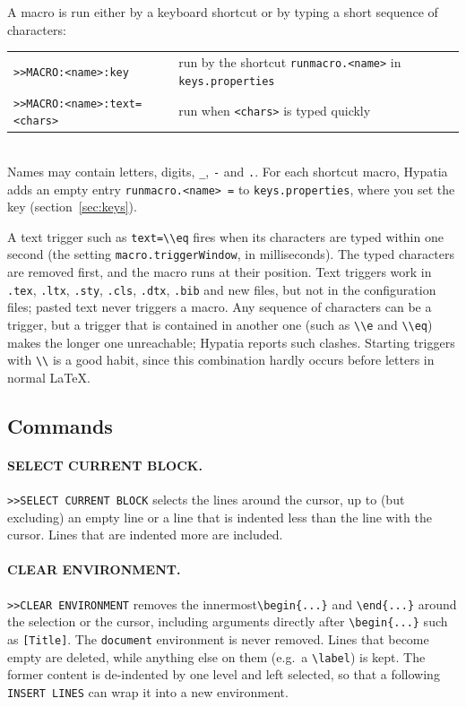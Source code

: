 \documentclass[11pt]{article}
\newcommand{\file}[1]{\texttt{#1}}
\begin{document}
    A macro is run either by a keyboard shortcut or by typing a short sequence of characters:\\[2mm]
    \hspace*{1cm}\begin{tabular}{ll}
        \verb+>>MACRO:<name>:key+ & run by the shortcut \verb+runmacro.<name>+ in \file{keys.properties}\\
        \verb+>>MACRO:<name>:text=<chars>+ & run when \verb+<chars>+ is typed quickly
    \end{tabular}\\[2mm]
    Names may contain letters, digits, \verb+_+, \verb+-+ and \verb+.+. For each shortcut macro, Hypatia adds an empty entry \verb+runmacro.<name> =+ to \file{keys.properties}, where you set the key (section~\ref{sec:keys}).

    A text trigger such as \verb+text=\\eq+ fires when its characters are typed within one second (the setting \verb+macro.triggerWindow+, in milliseconds). The typed characters are removed first, and the macro runs at their position. Text triggers work in \verb+.tex+, \verb+.ltx+, \verb+.sty+, \verb+.cls+, \verb+.dtx+, \verb+.bib+ and new files, but not in the configuration files; pasted text never triggers a macro. Any sequence of characters can be a trigger, but a trigger that is contained in another one (such as \verb+\\e+ and \verb+\\eq+) makes the longer one unreachable; Hypatia reports such clashes. Starting triggers with \verb+\\+ is a good habit, since this combination hardly occurs before letters in normal LaTeX.

    \subsection{Commands}

    \paragraph{SELECT CURRENT BLOCK.}
    \verb+>>SELECT CURRENT BLOCK+ selects the lines around the cursor, up to (but excluding) an empty line or a line that is indented less than the line with the cursor. Lines that are indented more are included.

    \paragraph{CLEAR ENVIRONMENT.}
    \verb+>>CLEAR ENVIRONMENT+ removes the innermost\linebreak \verb+\begin{...}+ and \verb+\end{...}+ around the selection or the cursor, including arguments directly after \verb+\begin{...}+ such as \verb+[Title]+. The \verb+document+ environment is never removed. Lines that become empty are deleted, while anything else on them (e.g.\ a \verb+\label+) is kept. The former content is de-indented by one level and left selected, so that a following \verb+INSERT LINES+ can wrap it into a new environment.
\end{document}
